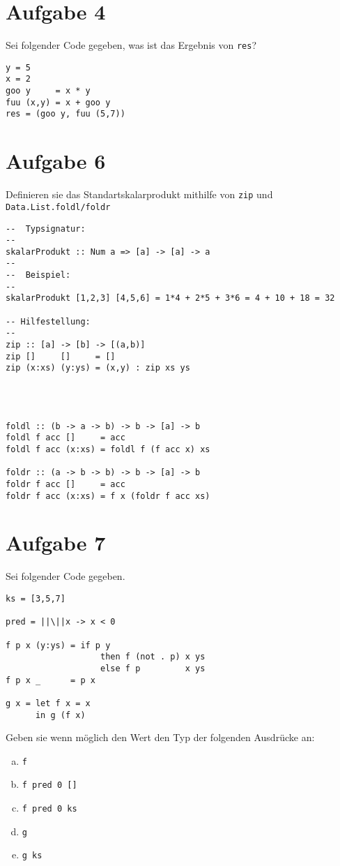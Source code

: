 \documentclass{article}
\begin{document}
\section*{Aufgabe 4}
Sei folgender Code gegeben, was ist das Ergebnis von \texttt{res}?
\begin{verbatim}
y = 5
x = 2
goo y     = x * y
fuu (x,y) = x + goo y
res = (goo y, fuu (5,7))
\end{verbatim}

\section*{Aufgabe 6}
Definieren sie das Standartskalarprodukt mithilfe von \texttt{zip} und \texttt{Data.List.foldl/foldr}

\begin{verbatim}
--  Typsignatur:
--
skalarProdukt :: Num a => [a] -> [a] -> a
--
--  Beispiel:
--
skalarProdukt [1,2,3] [4,5,6] = 1*4 + 2*5 + 3*6 = 4 + 10 + 18 = 32

-- Hilfestellung:
--
zip :: [a] -> [b] -> [(a,b)]
zip []     []     = []
zip (x:xs) (y:ys) = (x,y) : zip xs ys




foldl :: (b -> a -> b) -> b -> [a] -> b
foldl f acc []     = acc
foldl f acc (x:xs) = foldl f (f acc x) xs

foldr :: (a -> b -> b) -> b -> [a] -> b
foldr f acc []     = acc
foldr f acc (x:xs) = f x (foldr f acc xs)
\end{verbatim}

\section*{Aufgabe 7}
Sei folgender Code gegeben.
\begin{verbatim}
ks = [3,5,7]

pred = ||\||x -> x < 0

f p x (y:ys) = if p y
                   then f (not . p) x ys
                   else f p         x ys
f p x _      = p x

g x = let f x = x
      in g (f x)
\end{verbatim}

Geben sie wenn möglich den Wert den Typ der folgenden Ausdrücke an:

\begin{enumerate} [a)]
    \item \texttt{f} \\[2mm]
    \item \texttt{f pred 0 []} \\[2mm]
    \item \texttt{f pred 0 ks} \\[2mm]
    \item \texttt{g} \\[2mm]
    \item \texttt{g ks} \\[2mm]
\end{enumerate}
\end{document}
